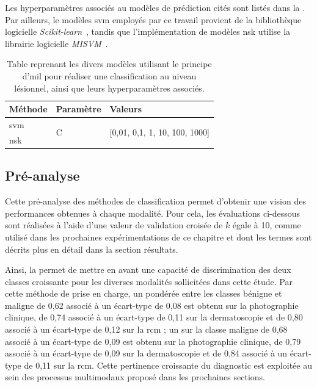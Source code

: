 Les hyperparamètres associés au modèles de prédiction cités sont listés dans la . Par ailleurs, le modèles \gls{svm} employés par ce travail provient de la bibliothèque logicielle \textit{Scikit-learn}~\cite{pedregosa2011}, tandis que l'implémentation de modèles \gls{nsk} utilise la librairie logicielle \textit{MISVM}~\cite{Doran2014}.\par
\begin{table}[H]
    \centering
    \begin{tabular}{lll}
    \toprule
    \textbf{Méthode}    & \textbf{Paramètre}& \textbf{Valeurs}                                  \\ \midrule
    \gls{svm}           & \multirow{2}{*}{C}& \multirow{2}{*}{[0,01, 0,1, 1, 10, 100, 1000]}    \\ \cline{1-1}
    \gls{nsk}           &                   &                                                   \\ \bottomrule 
    \end{tabular}    
    \caption{Table reprenant les divers modèles utilisant le principe d'\gls{mil} pour réaliser une classification au niveau lésionnel, ainsi que leurs hyperparamètres associés.}
    \label{tab:multimodal_models_parameters}
\end{table}\par
\clearpage

\subsection{Pré-analyse}
Cette pré-analyse des méthodes de classification permet d'obtenir une vision des performances obtenues à chaque modalité. Pour cela, les évaluations ci-dessous sont réalisées à l'aide d'une valeur de validation croisée de $k$ égale à 10, comme utilisé dans les prochaines expérimentations de ce chapitre et dont les termes sont décrits plus en détail dans la section résultats.\par

Ainsi, la  permet de mettre en avant une capacité de discrimination des deux classes croissante pour les diverses modalités sollicitées dans cette étude. Par cette méthode de prise en charge, un \fscore{} pondérée entre les classes bénigne et maligne de 0,62 associé à un écart-type de 0,08 est obtenu sur la photographie clinique, de 0,74 associé à un écart-type de 0,11 sur la dermatoscopie et de 0,80 associé à un écart-type de 0,12 sur la \gls{rcm} ; un \fscore{} sur la classe maligne de 0,68 associé à un écart-type de 0,09 est obtenu sur la photographie clinique, de 0,79 associé à un écart-type de 0,09 sur la dermatoscopie et de 0,84 associé à un écart-type de 0,11 sur la \gls{rcm}. Cette pertinence croissante du diagnostic est exploitée au sein des processus multimodaux proposé dans les prochaines sections.\par

